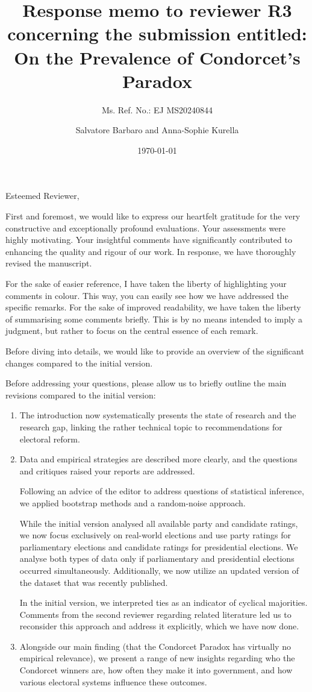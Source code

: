 \documentclass[a4paper, 12pt]{scrartcl}
\title{{\small Response memo to reviewer R3 concerning the submission entitled:} \\ On the Prevalence of Condorcet's Paradox }
\subtitle{Ms. Ref. No.: EJ MS20240844}
\author{Salvatore Barbaro and Anna-Sophie Kurella}
\date{\today}
\theoremstyle{break}
\begin{document}
\maketitle


\noindent Esteemed Reviewer,

First and foremost, we would like to express our heartfelt gratitude for the very constructive and exceptionally profound evaluations. Your assessments were highly motivating. Your insightful comments have significantly contributed to enhancing the quality and rigour of our work. In response, we have thoroughly revised the manuscript.

For the sake of easier reference, I have taken the liberty of highlighting your comments in colour. This way, you can easily see how we have addressed the specific remarks. For the sake of improved readability, we have taken the liberty of summarising some comments briefly. This is by no means intended to imply a judgment, but rather to focus on the central essence of each remark.

Before diving into details, we would like to provide an overview of the significant changes compared to the initial version.

Before addressing your questions, please allow us to briefly outline the main revisions compared to the initial version:
\begin{enumerate}
\item The introduction now systematically presents the state of research and the research gap, linking the rather technical topic to recommendations for electoral reform.
\item Data and empirical strategies are described more clearly, and the questions and critiques raised your reports are addressed.
	
Following an advice of the editor to address questions of statistical inference, we applied bootstrap methods and a random-noise approach.
	
While the initial version analysed all available party and candidate ratings, we now focus exclusively on real-world elections and use party ratings for parliamentary elections and candidate ratings for presidential elections. We analyse both types of data only if parliamentary and presidential elections occurred simultaneously. Additionally, we now utilize an updated version of the dataset that was recently published. 
	
	
In the initial version, we interpreted ties as an indicator of cyclical majorities. Comments from the second reviewer regarding related literature led us to reconsider this approach and address it explicitly, which we have now done.
%
\item Alongside our main finding (that the Condorcet Paradox has virtually no empirical relevance), we present a range of new insights regarding who the Condorcet winners are, how often they make it into government, and how various electoral systems influence these outcomes.
\end{enumerate}
\end{document}
